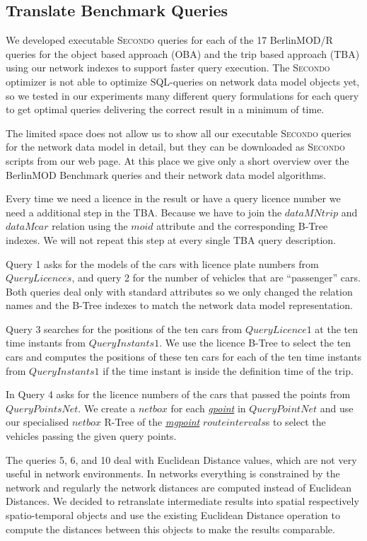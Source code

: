\documentclass[a4paper]{article}
\newcommand{\secondo}{\textsc{Secondo}}
\newcommand{\bmodb} {BerlinMOD Benchmark}
\newcommand{\dt}[1]{\textsl{\underline{#1}}}
\begin{document}
{\subsection{Translate Benchmark Queries}
\label{sec:queries}
We developed executable \secondo{} queries for each of the 17 BerlinMOD/R queries
for the object based approach (OBA) and the trip based approach (TBA) using our
network indexes to support faster query execution. The \secondo{} optimizer is not
able to optimize SQL-queries on network data model objects yet, so we tested in
our experiments many different query formulations for each query to get optimal
queries delivering the correct result in a minimum of time.

The limited space does not allow us to show all our executable \secondo{} queries
for the network data model in detail, but they can be downloaded as \secondo{} scripts
from our web page. At this place we give only a short overview over the \bmodb{} queries
and their network data model algorithms.

Every time we need a licence in the result or have a query licence number we need
a additional step in the TBA. Because we have to join the $dataMNtrip$ and $dataMcar$
relation using the $moid$ attribute and the corresponding B-Tree indexes.
We will not repeat this step at every single TBA query description.

Query 1 asks for the models of the cars with licence plate numbers from $QueryLicences$,
and query 2 for the number of vehicles that are ``passenger'' cars. Both queries
deal only with standard attributes so we only changed the relation names and the
B-Tree indexes to match the network data model representation.

Query 3 searches for the positions of the ten cars from $QueryLicence1$ at the
ten time instants from $QueryInstants1$. We use the licence B-Tree to select the
ten cars and computes the positions of these ten cars for each of the ten time
instants from $QueryInstants1$ if the time instant is inside the definition time
of the trip.

In Query 4 asks for the licence numbers of the cars that passed the points
from $QueryPointsNet$. We create a $netbox$ for each \dt{gpoint} in $QueryPointNet$
and use our specialised $netbox$ R-Tree of the \dt{mgpoint} $route intervals$s to
select the vehicles passing the given query points.

The queries 5, 6, and 10 deal with Euclidean Distance values, which are not very
useful in network environments. In networks everything is constrained by the
network and regularly the network distances are computed instead of Euclidean
Distances. We decided to retranslate intermediate results
into spatial respectively spatio-temporal objects and use the existing
Euclidean Distance operation to compute the distances between this objects to make
the results comparable.

}
\end{document}
